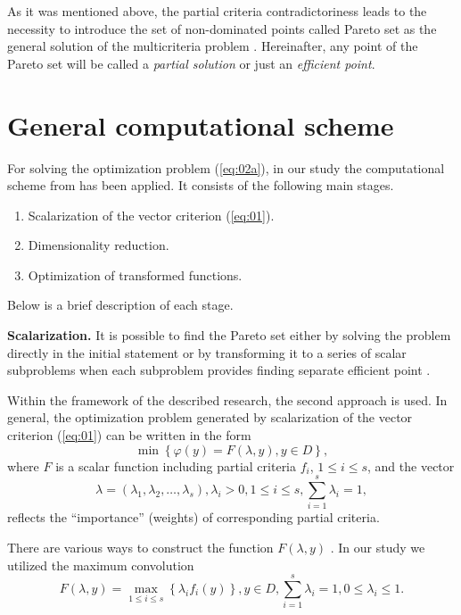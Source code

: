 \documentclass[runningheads]{llncs}
\begin{document}
As it was mentioned above, the partial criteria contradictoriness leads to the necessity to introduce the set of non-dominated points called Pareto set as the general solution of the multicriteria problem \cite{Miettinen1999,Ehrgott2005,Pardalos2017}. Hereinafter, any point of the Pareto set will be called a \textit{partial solution} or just an \textit{efficient point}.


\section{General computational scheme}
\label{sec:3}

For solving the optimization problem (\ref{eq:02a}), in our study the computational scheme from \cite{ML_MCO_2023} has been applied. It consists of the following main stages.
 \begin{enumerate}
	\item Scalarization of the vector criterion (\ref{eq:01}).
	\item Dimensionality reduction.
	\item Optimization of transformed functions.
\end{enumerate}
Below is a brief description of each stage.

\textbf{Scalarization.} It is possible to find the Pareto set either by solving the problem directly in the initial statement \cite{Evtushenko2014,Deb2002,Durillo2010,Mostaghim2007,NDG09,RC05,ZLT01} or by transforming it to a series of scalar subproblems when each subproblem provides finding separate efficient point \cite{Pardalos2017,ML_MCO_2023,Gergel2019_2,Gergel2018,GergelKozinov2020}.

Within the framework of the described research, the second approach is used. In general, the optimization problem generated by scalarization of the vector criterion (\ref{eq:01}) can be written in the form  
\begin{equation}
\label{eq:04}
\min \left\{\varphi(y) = F( \lambda, y ), y \in D\right\},
\end{equation}
where $F$ is a scalar function including partial criteria $f_i$, $1 \leq i \leq s$, and the vector
\begin{equation}
\label{eq:04a}
\lambda = (\lambda_1, \lambda_2, \dots, \lambda_s), \lambda_i > 0, 1 \leq i \leq s, \sum_{i = 1}^s {\lambda_i} = 1,
\end{equation}
reflects the ``importance'' (weights) of corresponding partial criteria. 

There are various ways to construct the function $F(\lambda, y)$ \cite{Miettinen1999,Ehrgott2005,GergelKozinov2020,Marler2004}. In our study we utilized the maximum convolution 
\begin{equation}
\label{eq:05}
F(\lambda, y) = \max_{1 \leq i \leq s} \left\{\lambda_i f_i (y)\right\}, y \in D, \sum_{i=1}^s {\lambda_i} = 1, 0 \leq \lambda_i \leq 1.
\end{equation}
\end{document}
